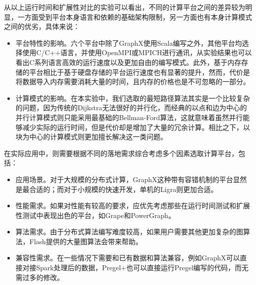 从以上运行时间和扩展性对比的实验可以看出，不同的计算平台之间的差异较为明显，一方面受到平台本身语言和依赖的基础架构限制，另一方面也有本身计算模式之间的优劣，具体来说：
\begin{itemize}
    \item 平台特性的影响。六个平台中除了GraphX使用Scala编写之外，其他平台均选择使用C/C++语言，并使用OpenMPI或MPICH进行通讯，从实验结果也可以看出C系列语言高效的运行速度以及更加自由的编写模式。此外，基于内存存储的平台相比于基于硬盘存储的平台运行速度也有显著的提升，然而，代价是将数据导入内存需要消耗大量的时间，且内存的价格也是不可忽略的一部分。
    \item 计算模式的影响。在本实验中，我们选取的最短路径算法其实是一个比较复杂的问题，因为传统的Dijkstra无法很好的并行化，而经典的以点和边为中心的并行计算模式则只能采用最基础的Bellman-Ford算法，这就意味着虽然并行能够减少实际的运行时间，但是代价却是增加了大量的冗余计算。相比之下，以块为中心的计算模式则更加擅长解决这一类问题。
\end{itemize}
在实际应用中，则需要根据不同的落地需求综合考虑多个因素选取计算平台，包括：
\begin{itemize}
    \item 应用场景。对于大规模的分布式计算，GraphX这种带有容错机制的平台显然是最合适的；而对于小规模的快速开发，单机的Ligra则更加合适。
    \item 性能需求。如果对性能有较高的要求，应优先考虑那些在运行时间测试和扩展性测试中表现出色的平台，如Grape和PowerGraph。
    \item 算法需求。由于分布式算法编写难度较高，如果用户需要其他更加复杂的图算法，Flash提供的大量图算法会带来帮助。
    \item 兼容性需求。在一些情况下需要和已有数据和算法兼容，例如GraphX可以直接对接Spark处理后的数据，Pregel+也可以直接运行Pregel编写的代码，而无需过多的修改。
\end{itemize}